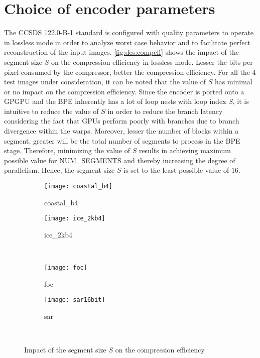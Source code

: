 \section{Choice of encoder parameters}\label{sec:params}
The CCSDS 122.0-B-1 standard is configured with quality parameters to operate in lossless mode in order to analyze worst case behavior and to facilitate perfect reconstruction of the input images. \autoref{fig:des:compeff} shows the impact of the segment size $S$ on the compression efficiency in lossless mode. Lesser the bits per pixel consumed by the compressor, better the compression efficiency. For all the 4 test images under consideration, it can be noted that the value of $S$ has minimal or no impact on the compression efficiency. Since the encoder is ported onto a \gls{GPGPU} and the \gls{BPE} inherently has a lot of loop nests with loop index $S$, it is intuitive to reduce the value of $S$ in order to reduce the branch latency considering the fact that \glspl{GPU} perform poorly with branches due to branch divergence within the warps. Moreover, lesser the number of blocks within a segment, greater will be the total number of segments to process in the \gls{BPE} stage. Therefore, minimizing the value of $S$ results in achieving maximum possible value for NUM\_SEGMENTS and thereby increasing the degree of parallelism. Hence, the segment size $S$ is set to the least possible value of $16$.
\begin{figure}[tb]
  \begin{subfigure}[b]{0.48\textwidth}
    \texttt{[image: coastal\_b4]}
    \caption{coastal\_b4}
    \label{fig:parameters:coastal_b4}
  \end{subfigure}
  \quad
  \begin{subfigure}[b]{0.48\textwidth}
    \texttt{[image: ice\_2kb4]}
    \caption{ice\_2kb4}
    \label{fig:parameters:ice_2kb4}
  \end{subfigure}\\
  \begin{subfigure}[b]{0.48\textwidth}
    \texttt{[image: foc]}
    \caption{foc}
    \label{fig:parameters:foc}
  \end{subfigure}
  \quad
  \begin{subfigure}[b]{0.48\textwidth}
    \texttt{[image: sar16bit]}
    \caption{sar}
    \label{fig:parameters:sar}
  \end{subfigure}\\
\caption{Impact of the segment size $S$ on the compression efficiency}
\label{fig:des:compeff}
\end{figure}

